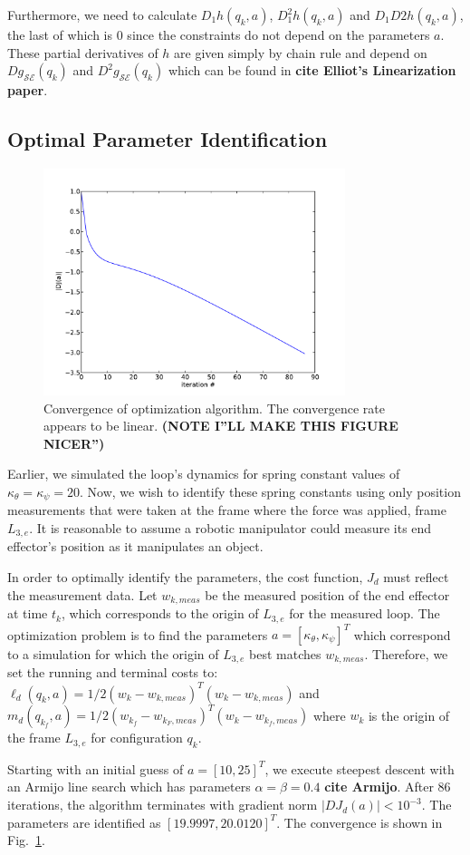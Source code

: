 \documentclass[letterpaper, 10pt, conference]{ieeeconf}
\begin{document}
Furthermore, we need to calculate $D_1h(q_k,a)$, $D_1^2h(q_k,a)$ and $D_1D2h(q_k,a)$, the last of which is $0$ since the constraints do not depend on the parameters $a$.  These partial derivatives of $h$ are given simply by chain rule and depend on $Dg_{\mathcal{S}\mathcal{E}}(q_k)$ and $D^2g_{\mathcal{S}\mathcal{E}}(q_k)$ which can be found in \textbf{cite Elliot's Linearization paper}.  

\subsection{Optimal Parameter Identification}
\begin{figure}
\centering
\includegraphics[width = 250pt]{convergence.pdf}
\caption{Convergence of optimization algorithm. The convergence rate appears to be linear.  \textbf{(NOTE I''LL MAKE THIS FIGURE NICER'')}}
\label{fig-conv}
\end{figure}
Earlier, we simulated the loop's dynamics for spring constant values of $\kappa_\theta = \kappa_\psi = 20$.  Now, we wish to identify these spring constants using only position measurements that were taken at the frame where the force was applied, frame $L_{3,e}$.  It is reasonable to assume a robotic manipulator could measure its end effector's position as it manipulates an object.  

In order to optimally identify the parameters, the cost function, $J_d$ must reflect the measurement data.  Let $w_{k,meas}$ be the measured position of the end effector at time $t_k$, which corresponds to the origin of $L_{3,e}$ for the measured loop.  The optimization problem is to find the parameters $a = [\kappa_\theta,\kappa_\psi]^T$ which correspond to a simulation for which the origin of $L_{3,e}$ best matches $w_{k,meas}$. Therefore, we set the running and terminal costs to: $\ell_d(q_k,a) = 1/2(w_k-w_{k,meas})^T(w_k-w_{k,meas})$ and $m_d(q_{k_f},a) =  1/2(w_{k_f}-w_{k_F,meas})^T(w_{k}-w_{{k_f},meas})$ where $w_k$ is the origin of the frame $L_{3,e}$ for configuration $q_k$.

Starting with an initial guess of $a = [10, 25]^T$, we execute steepest descent with an Armijo line search which has parameters $\alpha = \beta = 0.4$ \textbf{cite Armijo}.  After $86$ iterations, the algorithm terminates with gradient norm $|DJ_d(a)| < 10^{-3}$.  The parameters are identified as $[19.9997,  20.0120]^T$.  The convergence is shown in Fig.~\ref{fig-conv}.






\end{document}
